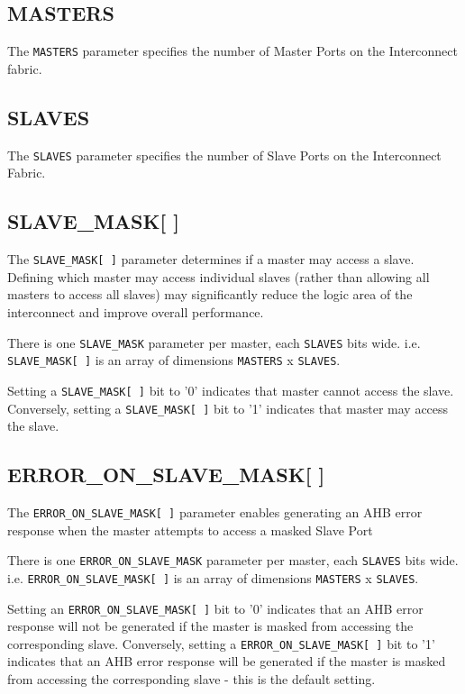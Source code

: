 \subsection{MASTERS}\label{masters}

The \texttt{MASTERS} parameter specifies the number of Master Ports on the
Interconnect fabric.

\subsection{SLAVES}\label{slaves}

The \texttt{SLAVES} parameter specifies the number of Slave Ports on the
Interconnect Fabric.

\subsection{SLAVE\_MASK[ ]}\label{slave_mask}

The \texttt{SLAVE\_MASK[\,]} parameter determines if a master may access a slave. Defining which
master may access individual slaves (rather than allowing all masters to access all slaves) may
significantly reduce the logic area of the interconnect and improve overall performance.

There is one \texttt{SLAVE\_MASK} parameter per master, each \texttt{SLAVES} bits wide.
i.e. \texttt{SLAVE\_MASK[\,]} is an array of dimensions \texttt{MASTERS} x \texttt{SLAVES}.

Setting a \texttt{SLAVE\_MASK[\,]} bit to '0' indicates that master cannot access the slave.
Conversely, setting a \texttt{SLAVE\_MASK[\,]} bit to '1' indicates that master may access the slave.

\subsection{ERROR\_ON\_SLAVE\_MASK[ ]}\label{error_on_slave_mask}

The \texttt{ERROR\_ON\_SLAVE\_MASK[\,]} parameter enables generating an AHB error response when the
master attempts to access a masked Slave Port

There is one \texttt{ERROR\_ON\_SLAVE\_MASK} parameter per master, each \texttt{SLAVES} bits wide.
i.e. \texttt{ERROR\_ON\_SLAVE\_MASK[\,]} is an array of dimensions \texttt{MASTERS} x \texttt{SLAVES}.

Setting an \texttt{ERROR\_ON\_SLAVE\_MASK[\,]} bit to '0' indicates that an AHB error response will not be generated
if the master is masked from accessing the corresponding slave.
Conversely, setting a \texttt{ERROR\_ON\_SLAVE\_MASK[\,]} bit to '1' indicates that an AHB error response will
be generated if the master is masked from accessing the corresponding slave - this is the default setting.
